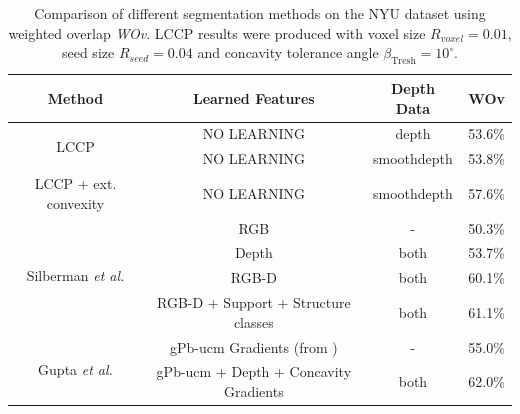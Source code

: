 \begin{table}[!htb]
  \centering
  \begin{tabular}{c|c|c|c}
  Method & Learned Features & Depth Data  & WOv\\ \hline \hline
  \multirow{2}{*}{LCCP} & NO LEARNING & depth & 53.6\% \\ \cline{2-4}
                                           & NO LEARNING & smoothdepth & 53.8\% \\ \hline
  LCCP + ext. convexity & NO LEARNING & smoothdepth &  57.6\% \\ \hline \hline
  \multirow{4}{*}{Silberman \textit{et al.}\cite{Silberman:ECCV12}} & RGB  & - &  50.3\% \\ \cline{2-4}
                                           & Depth & both  & 53.7\% \\ \cline{2-4}
                                           & RGB-D & both  & 60.1\% \\ \cline{2-4}
                                           & RGB-D + Support + Structure classes & both & 61.1\% \\ \hline \hline
  \multirow{2}{*}{Gupta \textit{et al.}\cite{Gupta:CVPR2013}} & gPb-ucm Gradients (from \cite{Arbelaez:PAMI2011}) & - &  55.0\% \\ \cline{2-4}
                                           & gPb-ucm + Depth + Concavity Gradients & both & 62.0\% \\ \hline
  \end{tabular}
  \caption[Comparison of NYU Dataset Results]{Comparison of different segmentation methods on the NYU dataset using weighted overlap \textit{WOv}. LCCP results were produced with voxel size $R_{voxel} = 0.01$, seed size $R_{seed}=0.04$ and concavity tolerance angle $\beta_\text{Tresh}=10^\circ$.}
  \label{tab:res_lccp_nyu}
\end{table}

